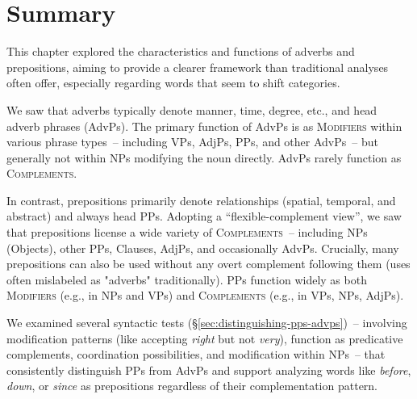 
\section{Summary}\label{sec:summary-ch4}

This chapter explored the characteristics and functions of adverbs and prepositions, aiming to provide a clearer framework than traditional analyses often offer, especially regarding words that seem to shift categories.

We saw that adverbs typically denote manner, time, degree, etc., and head adverb phrases (AdvPs). The primary function of AdvPs is as \textsc{Modifiers} within various phrase types~-- including VPs, AdjPs, PPs, and other AdvPs~-- but generally not within NPs modifying the noun directly. AdvPs rarely function as \textsc{Complements}.

In contrast, prepositions primarily denote relationships (spatial, temporal, and abstract) and always head PPs. Adopting a ``flexible-complement view'', we saw that prepositions license a wide variety of \textsc{Complements}~-- including NPs (Objects), other PPs, Clauses, AdjPs, and occasionally AdvPs. Crucially, many prepositions can also be used without any overt complement following them (uses often mislabeled as "adverbs" traditionally). PPs function widely as both \textsc{Modifiers} (e.g., in NPs and VPs) and \textsc{Complements} (e.g., in VPs, NPs, AdjPs).

We examined several syntactic tests (\S\ref{sec:distinguishing-pps-advps})~-- involving modification patterns (like accepting \textit{right} but not \textit{very}), function as predicative complements, coordination possibilities, and modification within NPs~-- that consistently distinguish PPs from AdvPs and support analyzing words like \textit{before}, \textit{down}, or \textit{since} as prepositions regardless of their complementation pattern.

